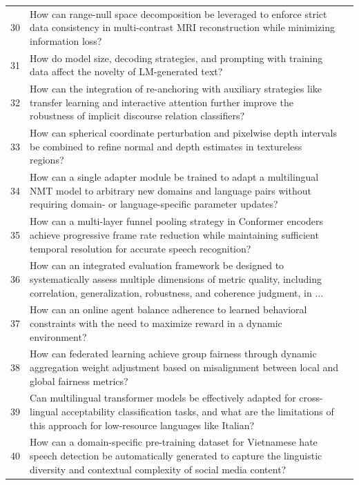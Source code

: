\begin{longtable}{@{}p{0.5cm}p{7.2cm}p{2.5cm}@{}}
30 & How can range-null space decomposition be leveraged to enforce strict data consistency in multi-contrast MRI reconstruction while minimizing information loss? & \cite{10.1609/aaai.v38i2.27869} \\
31 & How do model size, decoding strategies, and prompting with training data affect the novelty of LM-generated text? & \cite{10.18653/v1/2024.emnlp-main.800} \\
32 & How can the integration of re-anchoring with auxiliary strategies like transfer learning and interactive attention further improve the robustness of implicit discourse relation classifiers? & \cite{10.18653/v1/2021.findings-emnlp.110} \\
33 & How can spherical coordinate perturbation and pixelwise depth intervals be combined to refine normal and depth estimates in textureless regions? & \cite{10.1609/aaai.v38i7.28512} \\
34 & How can a single adapter module be trained to adapt a multilingual NMT model to arbitrary new domains and language pairs without requiring domain- or language-specific parameter updates? & \cite{10.18653/v1/2022.findings-emnlp.315} \\
35 & How can a multi-layer funnel pooling strategy in Conformer encoders achieve progressive frame rate reduction while maintaining sufficient temporal resolution for accurate speech recognition? & \cite{10.18653/v1/2024.naacl-long.344} \\
36 & How can an integrated evaluation framework be designed to systematically assess multiple dimensions of metric quality, including correlation, generalization, robustness, and coherence judgment, in ... & \cite{10.18653/v1/2021.acl-long.500} \\
37 & How can an online agent balance adherence to learned behavioral constraints with the need to maximize reward in a dynamic environment? & \cite{10.1609/aaai.v33i01.33013} \\
38 & How can federated learning achieve group fairness through dynamic aggregation weight adjustment based on misalignment between local and global fairness metrics? & \cite{10.1609/aaai.v37i6.25911} \\
39 & Can multilingual transformer models be effectively adapted for cross-lingual acceptability classification tasks, and what are the limitations of this approach for low-resource languages like Italian? & \cite{10.18653/v1/2021.findings-emnlp.250} \\
40 & How can a domain-specific pre-training dataset for Vietnamese hate speech detection be automatically generated to capture the linguistic diversity and contextual complexity of social media content? & \cite{10.18653/v1/2024.findings-acl.355} \\

\end{longtable}
